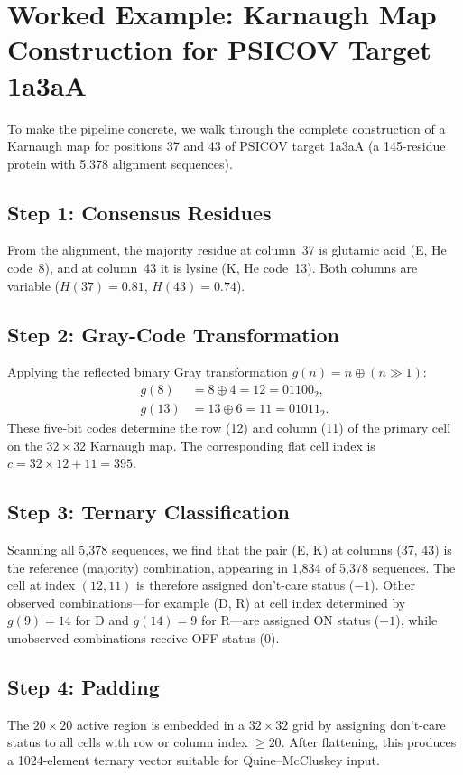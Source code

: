 \section{Worked Example: Karnaugh Map Construction for PSICOV Target 1a3aA}
\label{sec:worked-example}

To make the pipeline concrete, we walk through the complete construction of a
Karnaugh map for positions 37 and 43 of PSICOV target 1a3aA (a 145-residue
protein with 5{,}378 alignment sequences).

\subsection{Step 1: Consensus Residues}
From the alignment, the majority residue at column~37 is glutamic acid (E,
He code~8), and at column~43 it is lysine (K, He code~13).  Both columns are
variable ($H(37) = 0.81$, $H(43) = 0.74$).

\subsection{Step 2: Gray-Code Transformation}
Applying the reflected binary Gray transformation $g(n) = n \oplus (n \gg 1)$:
\begin{align}
	g(8)  & = 8 \oplus 4 = 12 = 01100_2,  \\
	g(13) & = 13 \oplus 6 = 11 = 01011_2.
\end{align}
These five-bit codes determine the row (12) and column (11) of the primary
cell on the $32 \times 32$ Karnaugh map.  The corresponding flat cell index is
$c = 32 \times 12 + 11 = 395$.

\subsection{Step 3: Ternary Classification}
Scanning all 5{,}378 sequences, we find that the pair (E, K) at columns
(37, 43) is the reference (majority) combination, appearing in 1{,}834 of
5{,}378 sequences.  The cell at index $(12, 11)$ is therefore assigned
don't-care status ($-1$).  Other observed combinations---for example (D, R)
at cell index determined by $g(9) = 14$ for D and $g(14) = 9$ for R---are
assigned ON status ($+1$), while unobserved combinations receive OFF status
($0$).

\subsection{Step 4: Padding}
The $20 \times 20$ active region is embedded in a $32 \times 32$ grid by
assigning don't-care status to all cells with row or column index $\geq 20$.
After flattening, this produces a 1024-element ternary vector suitable for
Quine--McCluskey input.

